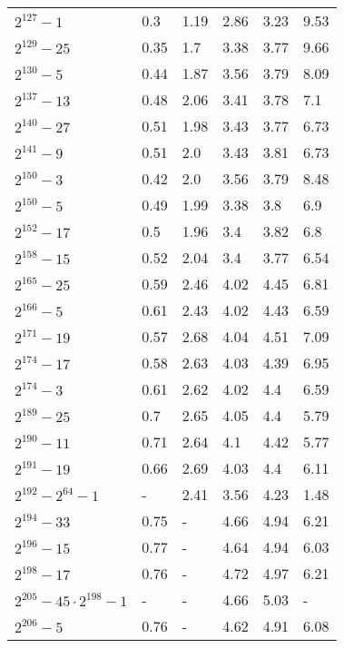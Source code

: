 \documentclass[conference,letterpaper]{IEEEtran}
\begin{document}
\footnotesize
\centering
\begin{xtabular}{|l|p{0.6cm}@{}|p{0.75cm}@{}|p{0.75cm}@{}|p{0.7cm}@{}|p{0.75cm}@{}|}
	$2^{127}-1$ & 0.3 & 1.19 & 2.86 & 3.23 & 9.53 \\
	$2^{129}-25$ & 0.35 & 1.7 & 3.38 & 3.77 & 9.66 \\
	$2^{130}-5$ & 0.44 & 1.87 & 3.56 & 3.79 & 8.09 \\
	$2^{137}-13$ & 0.48 & 2.06 & 3.41 & 3.78 & 7.1 \\
	$2^{140}-27$ & 0.51 & 1.98 & 3.43 & 3.77 & 6.73 \\
	$2^{141}-9$ & 0.51 & 2.0 & 3.43 & 3.81 & 6.73 \\
	$2^{150}-3$ & 0.42 & 2.0 & 3.56 & 3.79 & 8.48 \\
	$2^{150}-5$ & 0.49 & 1.99 & 3.38 & 3.8 & 6.9 \\
	$2^{152}-17$ & 0.5 & 1.96 & 3.4 & 3.82 & 6.8 \\
	$2^{158}-15$ & 0.52 & 2.04 & 3.4 & 3.77 & 6.54 \\
	$2^{165}-25$ & 0.59 & 2.46 & 4.02 & 4.45 & 6.81 \\
	$2^{166}-5$ & 0.61 & 2.43 & 4.02 & 4.43 & 6.59 \\
	$2^{171}-19$ & 0.57 & 2.68 & 4.04 & 4.51 & 7.09 \\
	$2^{174}-17$ & 0.58 & 2.63 & 4.03 & 4.39 & 6.95 \\
	$2^{174}-3$ & 0.61 & 2.62 & 4.02 & 4.4 & 6.59 \\
	$2^{189}-25$ & 0.7 & 2.65 & 4.05 & 4.4 & 5.79 \\
	$2^{190}-11$ & 0.71 & 2.64 & 4.1 & 4.42 & 5.77 \\
	$2^{191}-19$ & 0.66 & 2.69 & 4.03 & 4.4 & 6.11 \\
	$2^{192}-2^{64}-1$ & - & 2.41 & 3.56 & 4.23 & 1.48 \\
	$2^{194}-33$ & 0.75 & - & 4.66 & 4.94 & 6.21 \\
	$2^{196}-15$ & 0.77 & - & 4.64 & 4.94 & 6.03 \\
	$2^{198}-17$ & 0.76 & - & 4.72 & 4.97 & 6.21 \\
	$2^{205}-45\cdot 2^{198}-1$ & - & - & 4.66 & 5.03 & - \\
	$2^{206}-5$ & 0.76 & - & 4.62 & 4.91 & 6.08 \\

\end{xtabular}
\end{document}
